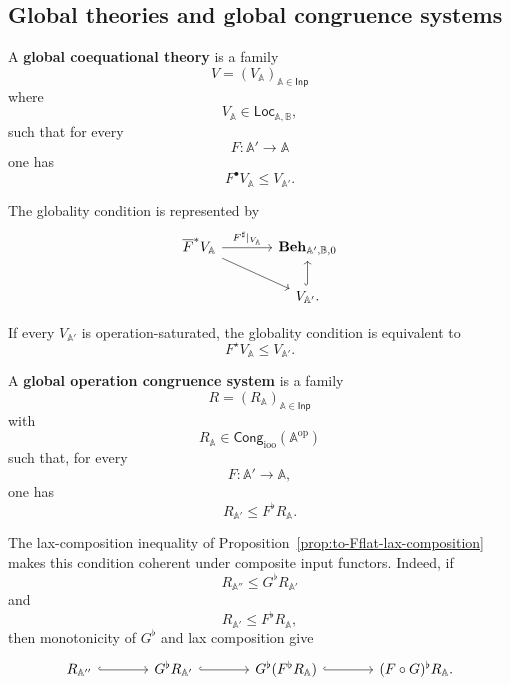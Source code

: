 \subsection{Global theories and global congruence systems}
\label{subsec:to-global-theories-congruences}

\begin{definition}
\label{def:to-global-coequational-theory}
    A \textbf{global coequational theory} is a family
    \[
        V=(V_{\mathbb A})_{\mathbb A\in\mathsf{Inp}}
    \]
    where
    \[
        V_{\mathbb A}
        \in
        \mathsf{Loc}_{\mathbb A,\mathbb B},
    \]
    such that for every
    \[
        F:\mathbb A'\to\mathbb A
    \]
    one has
    \[
        F^\bullet V_{\mathbb A}
        \leq
        V_{\mathbb A'}.
    \]
\end{definition}

The globality condition is represented by
\[
\begin{tikzcd}[column sep=large]
    \overline F^*V_{\mathbb A}
        \arrow[r, "F^\sharp|_{V_{\mathbb A}}"]
        \arrow[dr]
    &
    \mathbf{Beh}_{\mathbb A',\mathbb B,0}
    \\
    &
    V_{\mathbb A'}
        \arrow[u, hook].
\end{tikzcd}
\]

If every \(V_{\mathbb A'}\) is operation-saturated, the globality condition is
equivalent to
\[
    F^\star V_{\mathbb A}
    \leq
    V_{\mathbb A'}.
\]

\begin{definition}
\label{def:to-global-congruence-system}
    A \textbf{global operation congruence system} is a family
    \[
        R=(R_{\mathbb A})_{\mathbb A\in\mathsf{Inp}}
    \]
    with
    \[
        R_{\mathbb A}
        \in
        \mathsf{Cong}_{\mathrm{ioo}}
        (\mathbb A^{\mathrm{op}})
    \]
    such that, for every
    \[
        F:\mathbb A'\to\mathbb A,
    \]
    one has
    \[
        R_{\mathbb A'}
        \leq
        F^\flat R_{\mathbb A}.
    \]
\end{definition}

The lax-composition inequality of
Proposition~\ref{prop:to-Fflat-lax-composition} makes this condition coherent
under composite input functors. Indeed, if
\[
    R_{\mathbb A''}
    \leq
    G^\flat R_{\mathbb A'}
\]
and
\[
    R_{\mathbb A'}
    \leq
    F^\flat R_{\mathbb A},
\]
then monotonicity of \(G^\flat\) and lax composition give
\[
\begin{tikzcd}[column sep=large]
    R_{\mathbb A''}
        \arrow[r, hook]
    &
    G^\flat R_{\mathbb A'}
        \arrow[r, hook]
    &
    G^\flat(F^\flat R_{\mathbb A})
        \arrow[r, hook]
    &
    (F\circ G)^\flat R_{\mathbb A}.
\end{tikzcd}
\]

